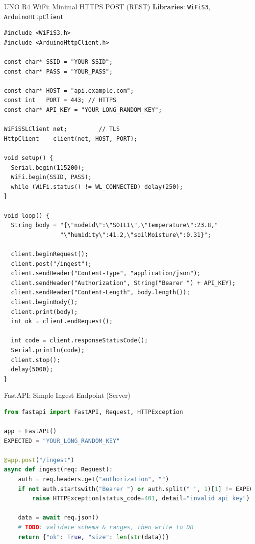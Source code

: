 \documentclass[aspectratio=169]{beamer}
\begin{document}
\begin{frame}[fragile]{UNO R4 WiFi: Minimal HTTPS POST (REST)}
\textbf{Libraries}: \texttt{WiFiS3}, \texttt{ArduinoHttpClient}
\begin{lstlisting}[language=Arduino,style=tinyterminal]
#include <WiFiS3.h>
#include <ArduinoHttpClient.h>

const char* SSID = "YOUR_SSID";
const char* PASS = "YOUR_PASS";

const char* HOST = "api.example.com";
const int   PORT = 443; // HTTPS
const char* API_KEY = "YOUR_LONG_RANDOM_KEY";

WiFiSSLClient net;         // TLS
HttpClient    client(net, HOST, PORT);

void setup() {
  Serial.begin(115200);
  WiFi.begin(SSID, PASS);
  while (WiFi.status() != WL_CONNECTED) delay(250);
}

void loop() {
  String body = "{\"nodeId\":\"SOIL1\",\"temperature\":23.8,"
                "\"humidity\":41.2,\"soilMoisture\":0.31}";

  client.beginRequest();
  client.post("/ingest");
  client.sendHeader("Content-Type", "application/json");
  client.sendHeader("Authorization", String("Bearer ") + API_KEY);
  client.sendHeader("Content-Length", body.length());
  client.beginBody();
  client.print(body);
  int ok = client.endRequest();

  int code = client.responseStatusCode();
  Serial.println(code);
  client.stop();
  delay(5000);
}
\end{lstlisting}
\end{frame}

\begin{frame}[fragile]{FastAPI: Simple Ingest Endpoint (Server)}
\begin{lstlisting}[language=Python,style=tinyterminal]
from fastapi import FastAPI, Request, HTTPException

app = FastAPI()
EXPECTED = "YOUR_LONG_RANDOM_KEY"

@app.post("/ingest")
async def ingest(req: Request):
    auth = req.headers.get("authorization", "")
    if not auth.startswith("Bearer ") or auth.split(" ", 1)[1] != EXPECTED:
        raise HTTPException(status_code=401, detail="invalid api key")

    data = await req.json()
    # TODO: validate schema & ranges, then write to DB
    return {"ok": True, "size": len(str(data))}
\end{lstlisting}
\end{frame}
\end{document}
